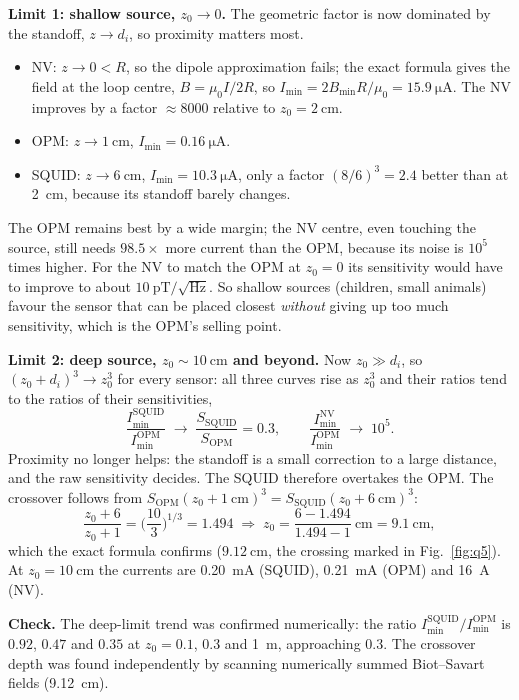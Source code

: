\documentclass[11pt]{article}
\newcommand{\sqHz}{\ensuremath{/\sqrt{\mathrm{Hz}}}}
\begin{document}
\textbf{Limit 1: shallow source, $z_0\to0$.} The geometric factor is now dominated by the standoff,
$z\to d_i$, so proximity matters most.
\begin{itemize}[nosep]
\item NV: $z\to 0 < R$, so the dipole approximation fails; the exact formula gives the field at the
loop centre, $B=\mu_0I/2R$, so $I_{\min}=2B_{\min}R/\mu_0 = \SI{15.9}{\micro\ampere}$. The NV
improves by a factor $\approx 8000$ relative to $z_0=\SI{2}{\centi\metre}$.
\item OPM: $z\to\SI{1}{\centi\metre}$, $I_{\min} = \SI{0.16}{\micro\ampere}$.
\item SQUID: $z\to\SI{6}{\centi\metre}$, $I_{\min} = \SI{10.3}{\micro\ampere}$, only a factor
$(8/6)^3=2.4$ better than at \SI{2}{\centi\metre}, because its standoff barely changes.
\end{itemize}
The OPM remains best by a wide margin; the NV centre, even touching the source, still needs
$98.5\times$ more current than the OPM, because its noise is $10^5$ times higher. For the NV to
match the OPM at $z_0=0$ its sensitivity would have to improve to about $\SI{10}{\pico\tesla}\sqHz$.
So shallow sources (children, small animals) favour the sensor that can be placed closest
\emph{without} giving up too much sensitivity, which is the OPM's selling point.

\textbf{Limit 2: deep source, $z_0\sim\SI{10}{\centi\metre}$ and beyond.} Now $z_0\gg d_i$, so
$(z_0+d_i)^3\to z_0^3$ for every sensor: all three curves rise as $z_0^3$ and their ratios tend to the
ratios of their sensitivities,
\[
\frac{I_{\min}^{\mathrm{SQUID}}}{I_{\min}^{\mathrm{OPM}}}\;\to\;\frac{S_{\mathrm{SQUID}}}{S_{\mathrm{OPM}}}=0.3,
\qquad
\frac{I_{\min}^{\mathrm{NV}}}{I_{\min}^{\mathrm{OPM}}}\;\to\;10^{5}.
\]
Proximity no longer helps: the standoff is a small correction to a large distance, and the raw
sensitivity decides. The SQUID therefore overtakes the OPM. The crossover follows from
$S_{\mathrm{OPM}}(z_0+\SI{1}{\centi\metre})^3 = S_{\mathrm{SQUID}}(z_0+\SI{6}{\centi\metre})^3$:
\[
\frac{z_0+6}{z_0+1} = \Big(\frac{10}{3}\Big)^{1/3} = 1.494
\;\Rightarrow\;
z_0 = \frac{6-1.494}{1.494-1}\ \mathrm{cm} = \SI{9.1}{\centi\metre},
\]
which the exact formula confirms ($\SI{9.12}{\centi\metre}$, the crossing marked in
Fig.~\ref{fig:q5}). At $z_0 = \SI{10}{\centi\metre}$ the currents are \SI{0.20}{\milli\ampere}
(SQUID), \SI{0.21}{\milli\ampere} (OPM) and \SI{16}{\ampere} (NV).

\textbf{Check.} The deep-limit trend was confirmed numerically: the ratio
$I_{\min}^{\mathrm{SQUID}}/I_{\min}^{\mathrm{OPM}}$ is $0.92$, $0.47$ and $0.35$ at
$z_0 = 0.1$, $0.3$ and \SI{1}{\metre}, approaching $0.3$. The crossover depth was found
independently by scanning numerically summed Biot--Savart fields (\SI{9.12}{\centi\metre}).
\end{document}
